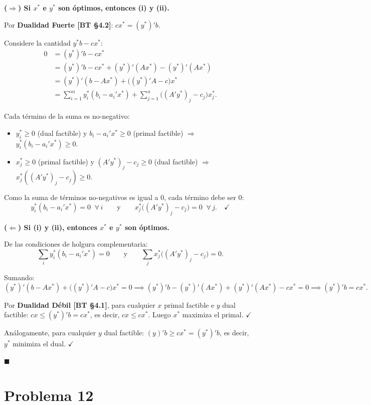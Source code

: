 \documentclass{article}
\begin{document}
\medskip
\textbf{($\Rightarrow$) Si $x^*$ e $y^*$ son óptimos, entonces (i) y (ii).}

Por \textbf{Dualidad Fuerte [BT §4.2]}: $cx^* = (y^*)' b$.

Considere la cantidad $y^*b - cx^*$:
\begin{align*}
  0 &= (y^*)'b - cx^* \\
    &= (y^*)'b - cx^* + (y^*)'(Ax^*) - (y^*)'(Ax^*) \\
    &= (y^*)'(b - Ax^*) + \bigl((y^*)'A - c\bigr)x^* \\
    &= \sum_{i=1}^{m} y_i^*(b_i - a_i'x^*) + \sum_{j=1}^{n} \bigl((A'y^*)_j - c_j\bigr)x_j^*.
\end{align*}

Cada término de la suma es no-negativo:
\begin{itemize}
  \item $y_i^* \geq 0$ (dual factible) y $b_i - a_i'x^* \geq 0$ (primal factible) $\Rightarrow$ $y_i^*(b_i - a_i'x^*) \geq 0$.
  \item $x_j^* \geq 0$ (primal factible) y $(A'y^*)_j - c_j \geq 0$ (dual factible) $\Rightarrow$ $x_j^*((A'y^*)_j - c_j) \geq 0$.
\end{itemize}

Como la suma de términos no-negativos es igual a $0$, cada término debe ser $0$:
\[
  y_i^*(b_i - a_i'x^*) = 0 \;\;\forall\, i \qquad \text{y} \qquad x_j^*\bigl((A'y^*)_j - c_j\bigr) = 0 \;\;\forall\, j. \quad \checkmark
\]

\medskip
\textbf{($\Leftarrow$) Si (i) y (ii), entonces $x^*$ e $y^*$ son óptimos.}

De las condiciones de holgura complementaria:
\[
  \sum_{i} y_i^*(b_i - a_i'x^*) = 0 \qquad \text{y} \qquad \sum_{j} x_j^*\bigl((A'y^*)_j - c_j\bigr) = 0.
\]

Sumando:
\[
  (y^*)'(b - Ax^*) + \bigl((y^*)'A - c\bigr)x^* = 0 \implies (y^*)'b - (y^*)'(Ax^*) + (y^*)'(Ax^*) - cx^* = 0 \implies (y^*)'b = cx^*.
\]

Por \textbf{Dualidad Débil [BT §4.1]}, para cualquier $x$ primal factible e $y$ dual factible: $cx \leq (y^*)'b = cx^*$, es decir, $cx \leq cx^*$. Luego $x^*$ maximiza el primal. $\checkmark$

Análogamente, para cualquier $y$ dual factible: $(y)'b \geq cx^* = (y^*)'b$, es decir, $y^*$ minimiza el dual. $\checkmark$

$\blacksquare$

\section*{Problema 12}
\end{document}
